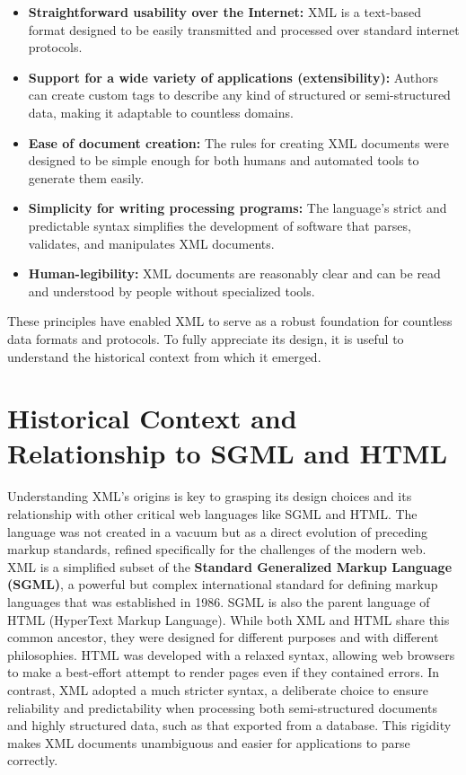 \documentclass{scrbook}
\begin{document}
\begin{itemize}
    \item
    \textbf{Straightforward usability over the Internet:} XML is a text-based format designed to be easily transmitted and processed over standard internet protocols.

    \item
    \textbf{Support for a wide variety of applications (extensibility):} Authors can create custom tags to describe any kind of structured or semi-structured data, making it adaptable to countless domains.

    \item 
    \textbf{Ease of document creation:} The rules for creating XML documents were designed to be simple enough for both humans and automated tools to generate them easily.

    \item 
    \textbf{Simplicity for writing processing programs:} The language's strict and predictable syntax simplifies the development of software that parses, validates, and manipulates XML documents.

    \item 
    \textbf{Human-legibility:} XML documents are reasonably clear and can be read and understood by people without specialized tools.
\end{itemize}

These principles have enabled XML to serve as a robust foundation for countless data formats and protocols. To fully appreciate its design, it is useful to understand the historical context from which it emerged.

\section{Historical Context and Relationship to SGML and HTML}

Understanding XML’s origins is key to grasping its design choices and its relationship with other critical web languages like SGML and HTML. The language was not created in a vacuum but as a direct evolution of preceding markup standards, refined specifically for the challenges of the modern web.\\

XML is a simplified subset of the \textbf{Standard Generalized Markup Language (SGML)}, a powerful but complex international standard for defining markup languages that was established in 1986. SGML is also the parent language of HTML (HyperText Markup Language). While both XML and HTML share this common ancestor, they were designed for different purposes and with different philosophies. HTML was developed with a relaxed syntax, allowing web browsers to make a best-effort attempt to render pages even if they contained errors. In contrast, XML adopted a much stricter syntax, a deliberate choice to ensure reliability and predictability when processing both semi-structured documents and highly structured data, such as that exported from a database. This rigidity makes XML documents unambiguous and easier for applications to parse correctly. \\
\end{document}
